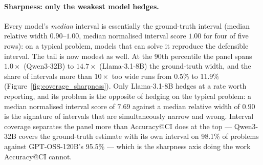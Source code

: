 \documentclass{article}
\begin{document}
\begin{table}[t]
\centering
\caption{Hardened calibration metrics. \textbf{Cover} is the fraction of problems where the model's own stated interval contains the ground-truth estimate (the coverage side of the interval score, distinct from Accuracy@CI). Widths are multiples of the ground-truth interval width; \textbf{hedge} is the fraction of intervals more than $10\times$ that width. \textbf{NIS} is the median normalised interval score (lower is better; $1.00$ = as costly as stating the ground-truth interval and hitting it). \textbf{Brier} decomposes as REL $-$ RES $+$ UNC (Murphy), where REL is miscalibration and RES is how much stated confidence separates correct from incorrect answers. \textbf{AUROC} is the discrimination of stated confidence over correctness; $0.50$ is chance. \textbf{dECE} is ECE minus its finite-$n$ null floor.}
\label{tab:real_llm_sharpness}
\end{table}

\paragraph{Sharpness: only the weakest model hedges.} Every model's \emph{median} interval is essentially the ground-truth interval (median relative width $0.90$--$1.00$, median normalised interval score $1.00$ for four of five rows): on a typical problem, models that can solve it reproduce the defensible interval. The tail is now modest as well. At the 90th percentile the panel spans $1.0\times$ (Qwen3-32B) to $14.7\times$ (Llama-3.1-8B) the ground-truth width, and the share of intervals more than $10\times$ too wide runs from 0.5\% to 11.9\% (Figure~\ref{fig:coverage_sharpness}). Only Llama-3.1-8B hedges at a rate worth reporting, and its problem is the opposite of hedging on the typical problem: a median normalised interval score of $7.69$ against a median relative width of $0.90$ is the signature of intervals that are simultaneously narrow and wrong. Interval coverage separates the panel more than Accuracy@CI does at the top --- Qwen3-32B covers the ground-truth estimate with its own interval on 98.1\% of problems against GPT-OSS-120B's 95.5\% --- which is the sharpness axis doing the work Accuracy@CI cannot.
\end{document}
